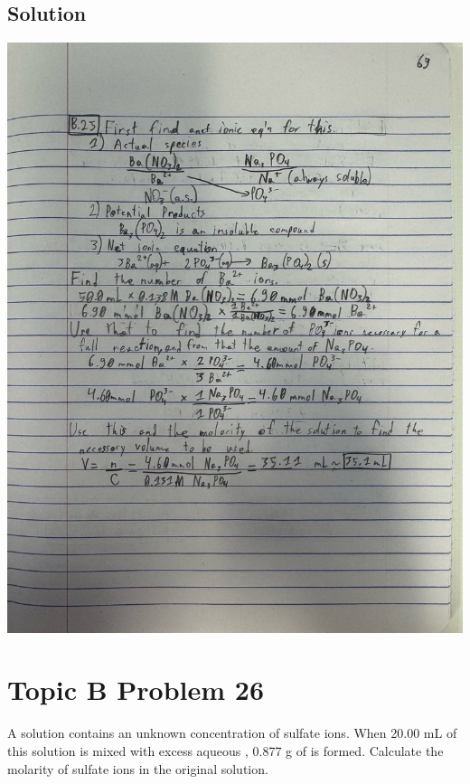 \documentclass[10pt]{article}
\begin{document}
        \subsection{Solution}
            \begin{center}
                \includegraphics[width=\textwidth, trim={5in 10in 3in 6in},clip]{"Answers Images/IMG_6655.jpg"}
            \end{center}

    \pagebreak
    \section{Topic B Problem 26}
        A solution contains an unknown concentration of sulfate ions. When 20.00 mL of this solution is mixed with excess aqueous , 0.877 g of  is formed. 
        Calculate the molarity of sulfate ions in the original solution.
\end{document}
